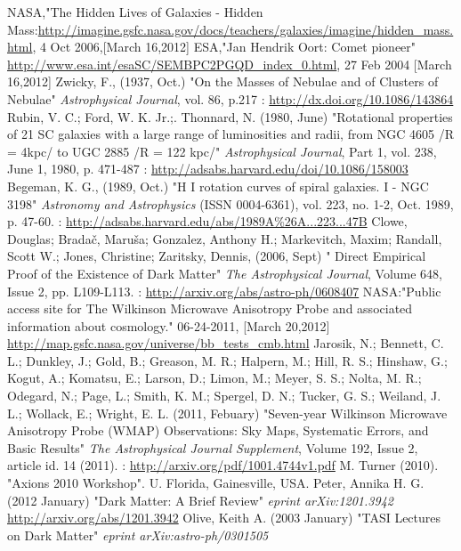 \documentclass[11pt,a4paper,oneside]{report}
\begin{document}
\begin{thebibliography}{9}
NASA,"The Hidden Lives of Galaxies - Hidden Mass:\url{http://imagine.gsfc.nasa.gov/docs/teachers/galaxies/imagine/hidden_mass.html}, 4 Oct 2006,[March 16,2012]
ESA,"Jan Hendrik Oort: Comet pioneer"
\url{http://www.esa.int/esaSC/SEMBPC2PGQD_index_0.html}, 27 Feb 2004 [March 16,2012]
Zwicky, F., (1937, Oct.) "On the Masses of Nebulae and of Clusters of Nebulae" \emph{Astrophysical Journal}, vol. 86, p.217 : 
\url{http://dx.doi.org/10.1086/143864}
Rubin, V. C.; Ford, W. K. Jr.;. Thonnard, N. (1980, June) "Rotational properties of 21 SC galaxies with a large range of luminosities and radii, from NGC 4605 /R = 4kpc/ to UGC 2885 /R = 122 kpc/" \emph{
Astrophysical Journal}, Part 1, vol. 238, June 1, 1980, p. 471-487 : 
\url{http://adsabs.harvard.edu/doi/10.1086/158003}
Begeman, K. G., (1989, Oct.) "H I rotation curves of spiral galaxies. I - NGC 3198" \emph{Astronomy and Astrophysics } (ISSN 0004-6361), vol. 223, no. 1-2, Oct. 1989, p. 47-60. : 
\url{http://adsabs.harvard.edu/abs/1989A%26A...223...47B}
Clowe, Douglas; Bradač, Maruša; Gonzalez, Anthony H.; Markevitch, Maxim; Randall, Scott W.; Jones, Christine; Zaritsky, Dennis, (2006, Sept) " Direct Empirical Proof of the Existence of Dark Matter" \emph{The Astrophysical Journal}, Volume 648, Issue 2, pp. L109-L113. : 
\url{  http://arxiv.org/abs/astro-ph/0608407}
NASA:"Public access site for The Wilkinson Microwave Anisotropy Probe and associated information about cosmology." 06-24-2011, [March 20,2012]
\url{  http://map.gsfc.nasa.gov/universe/bb_tests_cmb.html}
Jarosik, N.; Bennett, C. L.; Dunkley, J.; Gold, B.; Greason, M. R.; Halpern, M.; Hill, R. S.; Hinshaw, G.; Kogut, A.; Komatsu, E.; Larson, D.; Limon, M.; Meyer, S. S.; Nolta, M. R.; Odegard, N.; Page, L.; Smith, K. M.; Spergel, D. N.; Tucker, G. S.; Weiland, J. L.; Wollack, E.; Wright, E. L. (2011, Febuary) "Seven-year Wilkinson Microwave Anisotropy Probe (WMAP) Observations: Sky Maps, Systematic Errors, and Basic Results" \emph{The Astrophysical Journal Supplement}, Volume 192, Issue 2, article id. 14 (2011). :
\url{http://arxiv.org/pdf/1001.4744v1.pdf}
   M. Turner (2010). "Axions 2010 Workshop". U. Florida, Gainesville, USA.
Peter, Annika H. G. (2012 January) "Dark Matter: A Brief Review" \emph{eprint arXiv:1201.3942}
 \url{http://arxiv.org/abs/1201.3942}
Olive, Keith A. (2003 January) "TASI Lectures on Dark Matter" \emph{eprint arXiv:astro-ph/0301505}

\end{thebibliography}
\end{document}
